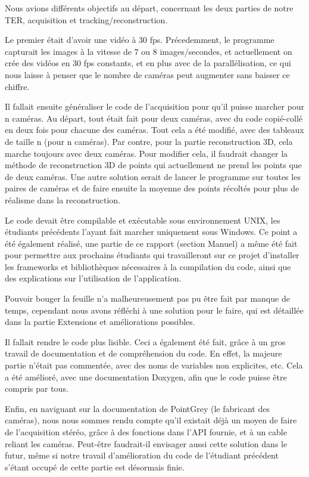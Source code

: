 Nous avions différents objectifs au départ, concernant les deux parties de notre TER, acquisition et tracking/reconstruction.

Le premier était d'avoir une vidéo à 30 fps. Précedemment, le programme capturait les images à la vitesse de 7 ou 8 images/secondes, et actuellement on crée des vidéos en 30 fps constants, et en plus avec de la parallélisation, ce qui nous laisse à penser que le nombre de caméras peut augmenter sans baisser ce chiffre.

Il fallait ensuite généraliser le code de l'acquisition pour qu'il puisse marcher pour n caméras. Au départ, tout était fait pour deux caméras, avec du code copié-collé en deux fois pour chacune des caméras. Tout cela a été modifié, avec des tableaux de taille n (pour n caméras). Par contre, pour la partie reconstruction 3D, cela marche toujours avec deux caméras. Pour modifier cela, il faudrait changer la méthode de reconstruction 3D de points qui actuellement ne prend les points que de deux caméras. Une autre solution serait de lancer le programme sur toutes les paires de caméras et de faire ensuite la moyenne des points récoltés pour plus de réalisme dans la reconstruction.

Le code devait être compilable et exécutable sous environnement UNIX, les étudiants précédents l'ayant fait marcher uniquement sous Windows. Ce point a été également réalisé, une partie de ce rapport (section Manuel) a même été fait pour permettre aux prochains étudiants qui travailleront sur ce projet d'installer les frameworks et bibliothèques nécessaires à la compilation du code, ainsi que des explications sur l'utilisation de l'application.

Pouvoir bouger la feuille n'a malheureusement pas pu être fait par manque de temps, cependant nous avons réfléchi à une solution pour le faire, qui est détaillée dans la partie Extensions et améliorations possibles.

Il fallait rendre le code plus lisible. Ceci a également été fait, grâce à un gros travail de documentation et de compréhension du code. En effet, la majeure partie n'était pas commentée, avec des noms de variables non explicites, etc. Cela a été amélioré, avec une documentation Doxygen, afin que le code puisse être compris par tous.

Enfin, en naviguant sur la documentation de PointGrey (le fabricant des caméras), nous nous sommes rendu compte qu'il existait déjà un moyen de faire de l'acquisition stéréo, grâce à des fonctions dans l'API fournie, et à un cable reliant les caméras. Peut-être faudrait-il envisager aussi cette solution dans le futur, même si notre travail d'amélioration du code de l'étudiant précédent s'étant occupé de cette partie est désormais finie.